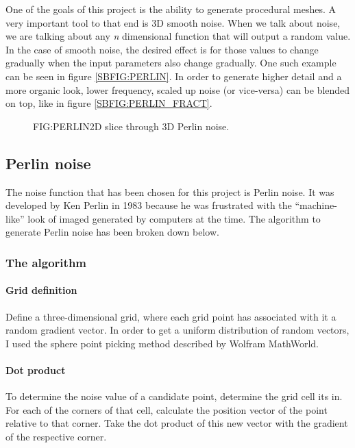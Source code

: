 One of the goals of this project is the ability to generate procedural meshes.
A very important tool to that end is 3D smooth noise.
When we talk about noise,
we are talking about any \textit{n} dimensional function that will output a random value.
In the case of smooth noise,
the desired effect is for those values to change gradually when the input parameters also change gradually.
One such example can be seen in figure \ref{SBFIG:PERLIN}.
In order to generate higher detail and a more organic look,
lower frequency, scaled up noise (or vice-versa) can be blended on top,
like in figure \ref{SBFIG:PERLIN_FRACT}.

\begin{figure}[Perlin noise example]{FIG:PERLIN}{2D slice through 3D Perlin noise.}
\end{figure}

\subsection{Perlin noise}

The noise function that has been chosen for this project is Perlin noise.
It was developed by Ken Perlin in 1983 because he was frustrated with the ``machine-like'' look of imaged generated by computers at the time.\cite{making_noise}
The algorithm to generate Perlin noise has been broken down below.

\subsubsection{The algorithm}

\paragraph{Grid definition}
Define a three-dimensional grid,
where each grid point has associated with it a random gradient vector.
In order to get a uniform distribution of random vectors,
I used the sphere point picking method described by Wolfram MathWorld\cite{sphere_point}.

\paragraph{Dot product}
To determine the noise value of a candidate point,
determine the grid cell its in.
For each of the corners of that cell,
calculate the position vector of the point relative to that corner.
Take the dot product of this new vector with the gradient of the respective corner.

